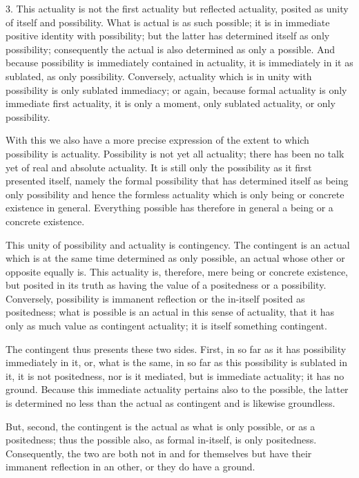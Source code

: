 3. This actuality is not the first actuality
but reflected actuality,
posited as unity of itself and possibility.
What is actual is as such possible;
it is in immediate positive identity with possibility;
but the latter has determined itself as only possibility;
consequently the actual is also determined as only a possible.
And because possibility is immediately contained in actuality,
it is immediately in it as sublated, as only possibility.
Conversely, actuality which is in unity with possibility
is only sublated immediacy;
or again, because formal actuality is only immediate first actuality,
it is only a moment, only sublated actuality, or only possibility.

With this we also have a more precise expression of
the extent to which possibility is actuality.
Possibility is not yet all actuality;
there has been no talk yet of real and absolute actuality.
It is still only the possibility as it first presented itself,
namely the formal possibility that has determined itself
as being only possibility and hence the formless actuality
which is only being or concrete existence in general.
Everything possible has therefore in general
a being or a concrete existence.

This unity of possibility and actuality is contingency.
The contingent is an actual which is at the same time
determined as only possible,
an actual whose other or opposite equally is.
This actuality is, therefore, mere being or concrete existence,
but posited in its truth as having the value
of a positedness or a possibility.
Conversely, possibility is immanent reflection
or the in-itself posited as positedness;
what is possible is an actual in this sense of actuality,
that it has only as much value as contingent actuality;
it is itself something contingent.

The contingent thus presents these two sides.
First, in so far as it has possibility immediately in it,
or, what is the same, in so far as
this possibility is sublated in it,
it is not positedness, nor is it mediated,
but is immediate actuality; it has no ground.
Because this immediate actuality pertains also to the possible,
the latter is determined no less than the actual as contingent
and is likewise groundless.

But, second, the contingent is the actual
as what is only possible, or as a positedness;
thus the possible also, as formal in-itself, is only positedness.
Consequently, the two are both not in and for themselves
but have their immanent reflection in an other,
or they do have a ground.

